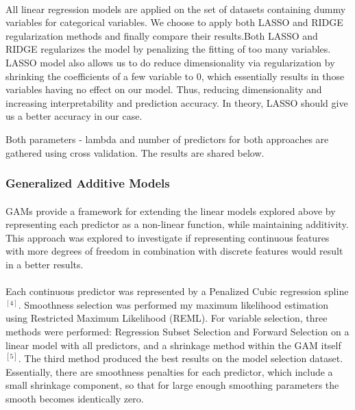 \documentclass[11pt]{article}
\begin{document}
            	\paragraph{}
                All linear regression models are applied on the set of datasets containing dummy variables for categorical variables. We choose to apply both LASSO and RIDGE regularization methods and finally compare their results.Both LASSO and RIDGE regularizes the model by penalizing the fitting of too many variables. LASSO model also allows us to do reduce dimensionality via regularization by shrinking the coefficients of a few variable  to 0, which essentially results in those variables having no effect on our model. Thus, reducing dimensionality and increasing interpretability and prediction accuracy. In theory, LASSO should give us a better accuracy in our case.
                
                Both parameters - lambda and number of predictors for both approaches are gathered using cross validation. The results are shared below.
                
            \subsubsection{Generalized Additive Models}
            	\paragraph{}
                GAMs provide a framework for extending the linear models explored above by representing each predictor as a non-linear function, while maintaining additivity. This approach was explored to investigate if representing continuous features with more degrees of freedom in combination with discrete features would result in a better results.
                \paragraph{}
                Each continuous predictor was represented by a Penalized Cubic regression spline$^{[4]}$. Smoothness selection was performed my maximum likelihood estimation using Restricted Maximum Likelihood (REML). For variable selection, three methods were performed: Regression Subset Selection and Forward Selection on a linear model with all predictors, and a shrinkage method within the GAM itself$^{[5]}$. The third method produced the best results on the model selection dataset. Essentially, there are smoothness penalties for each predictor, which include a small shrinkage component, so that for large enough smoothing parameters the smooth becomes identically zero.
\end{document}

